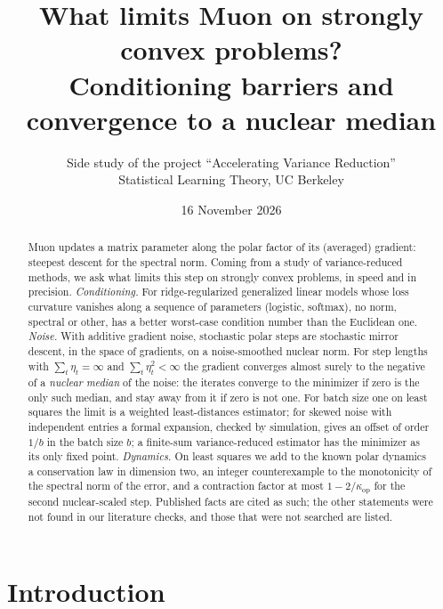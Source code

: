 \documentclass[11pt]{article}
\title{\vspace{-2.2em}What limits Muon on strongly convex problems?\\ Conditioning barriers and convergence to a nuclear median}
\author{Side study of the project ``Accelerating Variance Reduction''\\ Statistical Learning Theory, UC Berkeley}
\date{\vspace{-0.4em}16 November 2026}
\newcommand{\kop}{\kappa_{\mathrm{op}}}
\begin{document}
\maketitle

\begin{abstract}
Muon updates a matrix parameter along the polar factor of its (averaged) gradient: steepest descent for the spectral
norm. Coming from a study of variance-reduced methods, we ask what limits this step on strongly convex problems, in
speed and in precision. \emph{Conditioning.} For ridge-regularized generalized linear models whose loss curvature
vanishes along a sequence of parameters (logistic, softmax), no norm, spectral or other, has a better worst-case
condition number than the Euclidean one. \emph{Noise.} With additive gradient noise, stochastic polar steps are
stochastic mirror descent, in the space of gradients, on a noise-smoothed nuclear norm. For step lengths with
$\sum_t\eta_t=\infty$ and $\sum_t\eta_t^2<\infty$ the gradient converges almost surely to the negative of a
\emph{nuclear median} of the noise: the iterates converge to the minimizer if zero is the only such median, and stay
away from it if zero is not one. For batch size one on least squares the limit is a weighted least-distances
estimator; for skewed noise with independent entries a formal expansion, checked by simulation, gives an offset of
order $1/b$ in the batch size $b$; a finite-sum variance-reduced estimator has the minimizer as its only fixed point.
\emph{Dynamics.} On least squares we add to the known polar dynamics a conservation law in dimension two, an integer
counterexample to the monotonicity of the spectral norm of the error, and a contraction factor at most $1-2/\kop$ for
the second nuclear-scaled step. Published facts are cited as such; the other statements were not found in our
literature checks, and those that were not searched are listed.
\end{abstract}

\section{Introduction}
\end{document}
